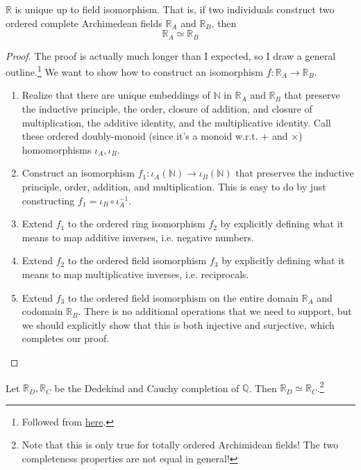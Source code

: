   \begin{theorem}[Uniqueness]
    $\mathbb{R}$ is unique up to field isomorphism. That is, if two individuals construct two ordered complete Archimedean fields $\mathbb{R}_A$ and $\mathbb{R}_B$, then 
    \begin{equation}
      \mathbb{R}_A \simeq \mathbb{R}_B
    \end{equation}
  \end{theorem}  
  \begin{proof}
    The proof is actually much longer than I expected, so I draw a general outline.\footnote{Followed from \href{https://math.ucr.edu/~res/math205A/uniqreals.pdf}{here}.} We want to show how to construct an isomorphism $f: \mathbb{R}_A \rightarrow \mathbb{R}_B$. 
    \begin{enumerate}
      \item Realize that there are unique embeddings of $\mathbb{N}$ in $\mathbb{R}_A$ and $\mathbb{R}_B$ that preserve the inductive principle, the order, closure of addition, and closure of multiplication, the additive identity, and the multiplicative identity. Call these ordered doubly-monoid (since it's a monoid w.r.t. $+$ and $\times$) homomorphisms $\iota_A, \iota_B$. 
      \item Construct an isomorphism $f_1: \iota_A(\mathbb{N}) \rightarrow \iota_B(\mathbb{N})$ that preserves the inductive principle, order, addition, and multiplication. This is easy to do by just constructing $f_1 = \iota_B \circ \iota_A^{-1}$. 
      \item Extend $f_1$ to the ordered ring isomorphism $f_2$ by explicitly defining what it means to map additive inverses, i.e. negative numbers. 
      \item Extend $f_2$ to the ordered field isomorphism $f_3$ by explicitly defining what it means to map multiplicative inverses, i.e. reciprocals. 
      \item Extend $f_3$ to the ordered field isomorphism on the entire domain $\mathbb{R}_A$ and codomain $\mathbb{R}_B$. There is no additional operations that we need to support, but we should explicitly show that this is both injective and surjective, which completes our proof. 
    \end{enumerate}
  \end{proof}

  \begin{corollary}
    Let $\mathbb{R}_D, \mathbb{R}_C$ be the Dedekind and Cauchy completion of $\mathbb{Q}$. Then $\mathbb{R}_D \simeq \mathbb{R}_C$.\footnote{Note that this is only true for totally ordered Archimidean fields! The two completeness properties are not equal in general!}
  \end{corollary}

